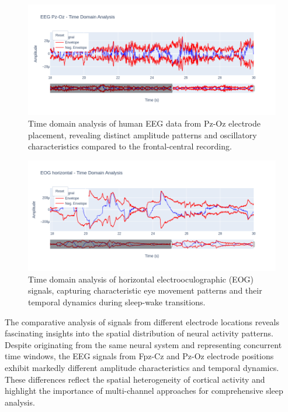 \documentclass[a4paper,12pt,twoside]{article}
\begin{document}
\begin{figure}[h]
  \centering
  \includegraphics[width=0.9\linewidth]{img/eeg pz oz time domain analysis}
  \caption{Time domain analysis of human EEG data from Pz-Oz electrode placement, revealing distinct amplitude patterns and oscillatory characteristics compared to the frontal-central recording.}
  \label{fig:eeg_pz_oz_time_domain}
\end{figure}

\begin{figure}[H]
  \centering
  \includegraphics[width=0.9\linewidth]{img/eog horizontal time domain analysis}
  \caption{Time domain analysis of horizontal electrooculographic (EOG) signals, capturing characteristic eye movement patterns and their temporal dynamics during sleep-wake transitions.}
  \label{fig:eog_horizontal_time_domain}
\end{figure}

The comparative analysis of signals from different electrode locations reveals fascinating insights into the spatial distribution of neural activity patterns. Despite originating from the same neural system and representing concurrent time windows, the EEG signals from Fpz-Cz and Pz-Oz electrode positions exhibit markedly different amplitude characteristics and temporal dynamics. These differences reflect the spatial heterogeneity of cortical activity and highlight the importance of multi-channel approaches for comprehensive sleep analysis.
\end{document}
